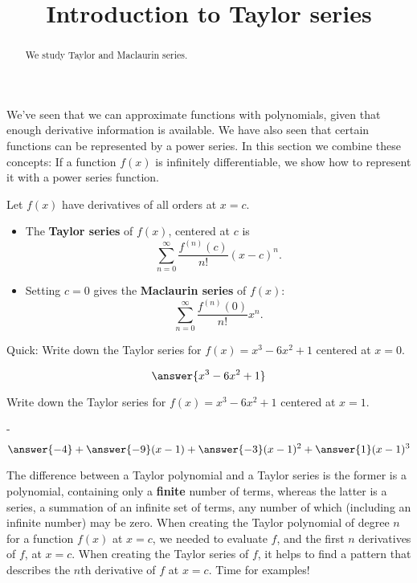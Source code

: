 \documentclass{ximera}
\title[Dig-In:]{Introduction to Taylor series}
\begin{document}
\begin{abstract}
  We study Taylor and Maclaurin series.
\end{abstract}
\maketitle

We've seen that we can approximate functions with polynomials, given
that enough derivative information is available.  We have also seen
that certain functions can be represented by a power series.  In this
section we combine these concepts: If a function $f(x)$ is infinitely
differentiable, we show how to represent it with a power series
function.

\begin{definition}
  Let $f(x)$ have derivatives of all orders at $x=c$.  
  \begin{itemize}
  \item The \textbf{Taylor series} of $f(x)$, centered at $c$ is
    \[
    \sum_{n=0}^\infty \frac{f^{(n)}(c)}{n!}(x-c)^n.
    \]
  \item Setting $c=0$ gives the \textbf{Maclaurin series} of $f(x)$:
    \[
    \sum_{n=0}^\infty \frac{f^{(n)}(0)}{n!}x^n.
    \]
  \end{itemize}
\end{definition}

\begin{question}
  Quick: Write down the Taylor series for $f(x) = x^3-6x^2+1$ centered
  at $x=0$.
  \begin{prompt}
    \[
    \answer{x^3-6x^2+1}
    \]
  \end{prompt}
  \begin{question}
    Write down the Taylor series for $f(x) = x^3-6x^2+1$ centered at
    $x=1$.
    \begin{prompt}-
      \[
      \answer{-4} + \answer{-9}(x-1) + \answer{-3}(x-1)^2 + \answer{1}(x-1)^3
      \]
    \end{prompt}
  \end{question}
\end{question}

The difference between a Taylor polynomial and a Taylor series is the
former is a polynomial, containing only a \textbf{finite} number of
terms, whereas the latter is a series, a summation of an infinite set
of terms, any number of which (including an infinite number) may be
zero. When creating the Taylor polynomial of degree $n$ for a function
$f(x)$ at $x=c$, we needed to evaluate $f$, and the first $n$
derivatives of $f$, at $x=c$. When creating the Taylor series of $f$,
it helps to find a pattern that describes the $n$th derivative of $f$
at $x=c$.  Time for examples!
\end{document}
